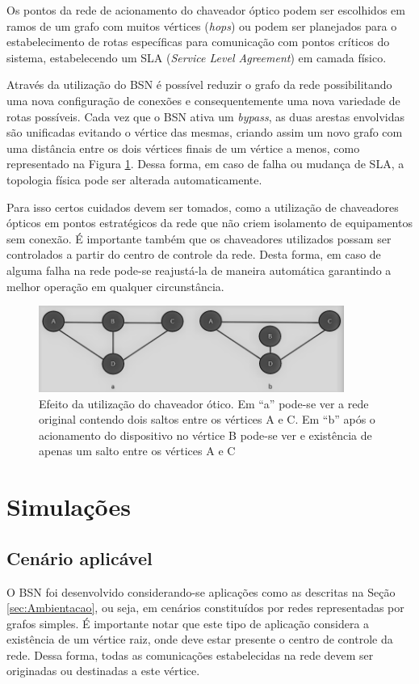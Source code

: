 \documentclass[12pt]{article}
\begin{document}
Os pontos da rede de acionamento do chaveador óptico podem ser escolhidos em ramos de um grafo com muitos vértices (\emph{hops}) ou podem ser planejados para o estabelecimento de rotas específicas para comunicação com pontos críticos do sistema, estabelecendo um SLA (\emph{Service Level Agreement}) em camada físico.

Através da utilização do BSN é possível reduzir o grafo da rede possibilitando uma nova configuração de conexões e consequentemente uma nova variedade de rotas possíveis. Cada vez que o BSN ativa um \emph{bypass}, as duas arestas envolvidas são unificadas evitando o vértice das mesmas, criando assim um novo grafo com uma distância entre os dois vértices finais de um vértice a menos, como representado na Figura \ref{fig_bypass_exemplo}. Dessa forma, em caso de falha ou mudança de SLA, a topologia física pode ser alterada automaticamente.

Para isso certos cuidados devem ser tomados, como a utilização de chaveadores ópticos em pontos estratégicos da rede que não criem isolamento de equipamentos sem conexão. É importante também que os chaveadores utilizados possam ser controlados a partir do centro de controle da rede. Desta forma, em caso de alguma falha na rede pode-se reajustá-la de maneira automática garantindo a melhor operação em qualquer circunstância.

\begin{figure} %
	\centering
	\includegraphics[width=10cm]{Bypass_exemplo_PB}
	\caption{Efeito da utilização do chaveador ótico. Em ``a'' pode-se ver a rede original contendo dois saltos entre os vértices A e C. Em ``b'' após o acionamento do dispositivo no vértice B pode-se ver e existência de apenas um salto entre os vértices A e C}
	\label{fig_bypass_exemplo}
\end{figure}

\section{Simulações}
\subsection{Cenário aplicável}
O BSN foi desenvolvido considerando-se aplicações como as descritas na Seção \ref{sec:Ambientacao}, ou seja, em cenários constituídos por redes representadas por grafos simples. É importante notar que este tipo de aplicação considera a existência de um vértice raiz, onde deve estar presente o centro de controle da rede. Dessa forma, todas as comunicações estabelecidas na rede devem ser originadas ou destinadas a este vértice.
\end{document}
